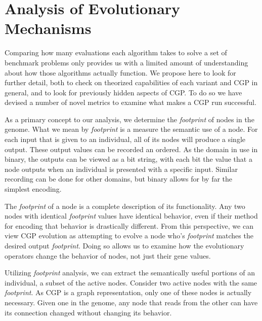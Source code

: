 \documentclass[journal]{IEEEtran}
\begin{document}
\section{Analysis of Evolutionary Mechanisms}
\label{sec:analysis}
Comparing how many evaluations each algorithm takes to solve a set of benchmark
problems only provides us with a limited amount of understanding about how
those algorithms actually function.  We propose here to look for further detail,
both to check on theorized capabilities of each variant and CGP in general, and
to look for previously hidden aspects of CGP.
To do so we have devised a number of novel metrics to examine what makes a
CGP run successful.

As a primary concept to our analysis, we determine the \emph{footprint} of nodes
in the genome.  What we mean by \emph{footprint} is a measure the semantic use
of a node.  For each input that is given to an individual, all of its nodes
will produce a single output.  These output values can be recorded an ordered.
As the domain in use in binary, the outputs can be viewed as a bit string, with
each bit the value that a node outputs when an individual is presented with a
specific input.  Similar recording can be done for other domains, but binary
allows for by far the simplest encoding.

The \emph{footprint} of a node is a complete description of its functionality.
Any two nodes with identical \emph{footprint} values have identical behavior,
even if their method for encoding that behavior is drastically different.  From
this perspective, we can view CGP evolution as attempting to evolve a node who's
\emph{footprint} matches the desired output \emph{footprint}.  Doing so allows
us to examine how the evolutionary operators change the behavior of nodes,
not just their gene values.

Utilizing \emph{footprint} analysis, we can extract the semantically useful
portions of an individual, a subset of the active nodes.  Consider two active
nodes with the same \emph{footprint}.  As CGP is a graph representation, only
one of these nodes is actually necessary.  Given one in the genome, any node that reads
from the other can have its connection changed without changing its behavior.
\end{document}
